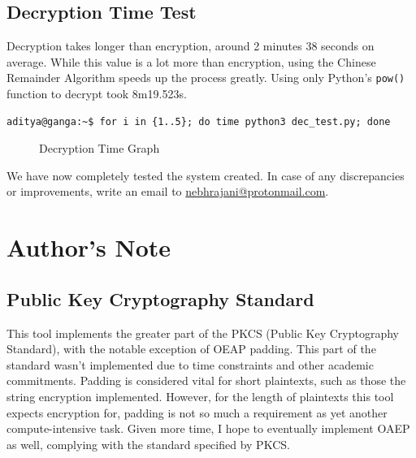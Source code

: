 \documentclass[titlepage]{article}
\begin{document}
\subsection{Decryption Time Test}
Decryption takes longer than encryption, around 2 minutes 38 seconds on average. While this value is
a lot more than encryption, using the Chinese Remainder Algorithm speeds up the process greatly.
Using only Python's \texttt{pow()} function to decrypt took 8m19.523s.

\begin{verbatim}
aditya@ganga:~$ for i in {1..5}; do time python3 dec_test.py; done
\end{verbatim}


\begin{figure}[H]
  \centering


  \caption{Decryption Time Graph}
\end{figure}
We have now completely tested the system created. In case of any discrepancies or improvements,
write an email to \href{mailto: nebhrajani@protonmail.com}{nebhrajani@protonmail.com}.

\cleardoublepage

\section{Author's Note}
\subsection{Public Key Cryptography Standard}
This tool implements the greater part of the PKCS (Public Key Cryptography Standard), with the
notable exception of OEAP padding. This part of the standard wasn't implemented due to time
constraints and other academic commitments. Padding is considered vital for short plaintexts, such
as those the string encryption implemented. However, for the length of plaintexts this tool
expects encryption for, padding is not so much a requirement as yet another compute-intensive task.
Given more time, I hope to eventually implement OAEP as well, complying with the standard
specified by PKCS.
\end{document}
